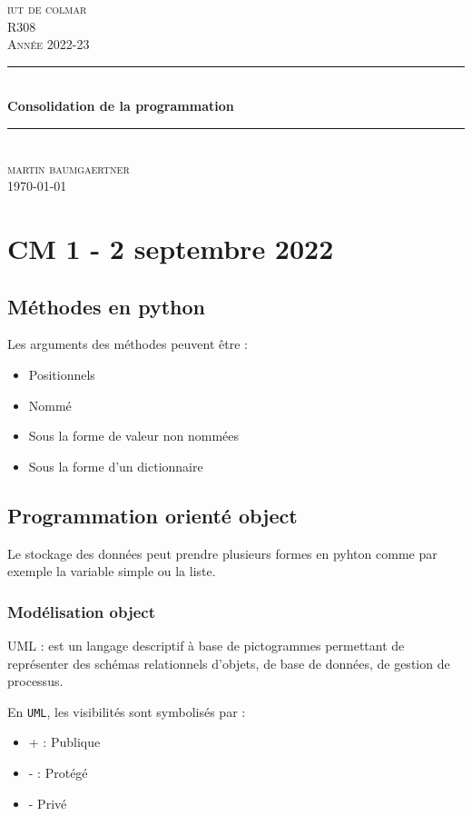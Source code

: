 \documentclass[12pt, a4paper]{article}
\begin{document}
\begin{titlepage}
	\newcommand{\HRule}{\rule{\linewidth}{0.5mm}} 
	\center 
	\textsc{\LARGE iut de colmar}\\[6.5cm] 
	\textsc{\Large R308}\\[0.5cm] 
	\textsc{\large Année 2022-23}\\[0.5cm]
	\HRule\\[0.75cm]
	{\huge\bfseries Consolidation de la programmation}\\[0.4cm]
	\HRule\\[1.5cm]
	\textsc{\large martin baumgaertner}\\[6.5cm] 

	\vfill\vfill\vfill
	{\large\today} 
	\vfill
\end{titlepage}
\newpage
\tableofcontents
\newpage
\section{CM 1 - 2 septembre 2022}

\subsection{Méthodes en python}
    Les arguments des méthodes peuvent être :
        \begin{itemize}
            \item Positionnels
            \item Nommé
            \item  Sous la forme de valeur non nommées
            \item  Sous la forme d'un dictionnaire
        \end{itemize}
    
\subsection{Programmation orienté object}
    Le stockage des données peut prendre plusieurs formes en pyhton comme
    par exemple la variable simple ou la liste. 

    \subsubsection{Modélisation object}
    UML : est un langage descriptif à base de pictogrammes permettant de
    représenter des schémas relationnels d'objets, de base de données, de gestion
    de processus. 

    En \texttt{UML}, les visibilités sont symbolisés par :
    \begin{itemize}
        \item + : Publique
        \item - : Protégé
        \item - Privé
    \end{itemize}
    
\end{document}
